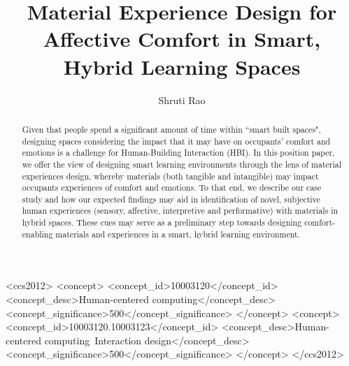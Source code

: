 \documentclass[acmconf, anonymous, review]{acmart}
\begin{document}
\title{Material Experience Design for Affective Comfort in Smart, Hybrid Learning Spaces}

\author{Shruti Rao}



\renewcommand{\shortauthors}{Rao et al.}

\begin{abstract}
Given that people spend a significant amount of time within ``smart built spaces", designing spaces considering the impact that it may have on occupants’ comfort and emotions is a challenge for Human-Building Interaction (HBI). In this position paper, we offer the view of designing smart learning environments through the lens of material experiences design, whereby materials (both tangible and intangible) may impact occupants experiences of comfort and emotions. To that end, we describe our case study and how our expected findings may aid in identification of novel, subjective human experiences (sensory, affective, interpretive and performative) with materials in hybrid spaces. These cues may serve as a preliminary step towards designing comfort-enabling materials  and experiences in a smart, hybrid learning environment. 
\end{abstract}


\begin{CCSXML}
<ccs2012>
   <concept>
       <concept_id>10003120</concept_id>
       <concept_desc>Human-centered computing</concept_desc>
       <concept_significance>500</concept_significance>
       </concept>
   <concept>
       <concept_id>10003120.10003123</concept_id>
       <concept_desc>Human-centered computing~Interaction design</concept_desc>
       <concept_significance>500</concept_significance>
       </concept>
 </ccs2012>
\end{CCSXML}
\end{document}
